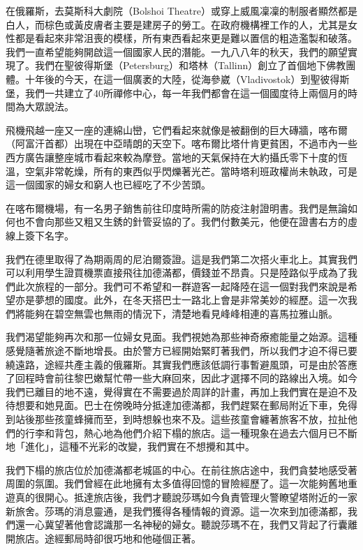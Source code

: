 在俄羅斯，去莫斯科大劇院（Bolshoi
Theatre）或穿上威風凜凜的制服者顯然都是白人，而棕色或黃皮膚者主要是建房子的勞工。在政府機構裡工作的人，尤其是女性都是看起來非常沮喪的模樣，所有東西看起來更是難以置信的粗造濫製和破落。我們一直希望能夠開啟這一個國家人民的潛能。一九八八年的秋天，我們的願望實現了。我們在聖彼得斯堡（Petersburg）和塔林（Tallinn）創立了首個地下佛教團體。十年後的今天，在這一個廣袤的大陸，從海參崴（Vladivostok）到聖彼得斯堡，我們一共建立了40所禪修中心，每一年我們都會在這一個國度待上兩個月的時間為大眾說法。

飛機飛越一座又一座的連綿山巒，它們看起來就像是被翻倒的巨大磚牆，喀布爾（阿富汗首都）出現在中亞晴朗的天空下。喀布爾比塔什肯更貧困，不過市內一些西方廣告讓整座城市看起來較為摩登。當地的天氣保持在大約攝氏零下十度的恆溫，空氣非常乾燥，所有的東西似乎閃爍著光芒。當時塔利班政權尚未執政，可是這一個國家的婦女和窮人也已經吃了不少苦頭。

在喀布爾機場，有一名男子銷售前往印度時所需的防疫注射證明書。我們是無論如何也不會向那些又粗又生銹的針管妥協的了。我們付數美元，他便在證書右方的虛線上簽下名字。

我們在德里取得了為期兩周的尼泊爾簽證。這是我們第二次搭火車北上。其實我們可以利用學生證買機票直接飛往加德滿都，價錢並不昂貴。只是陸路似乎成為了我們此次旅程的一部分。我們可不希望和一群遊客一起降陸在這一個對我們來說是希望亦是夢想的國度。此外，在冬天搭巴士一路北上會是非常美妙的經歷。這一次我們將能夠在碧空無雲也無雨的情況下，清楚地看見峰峰相連的喜馬拉雅山脈。

我們渴望能夠再次和那一位婦女見面。我們視她為那些神奇療癒能量之始源。這種感覺隨著旅途不斷地增長。由於警方已經開始緊盯著我們，所以我們才迫不得已要繞遠路，途經共產主義的俄羅斯。其實我們應該低調行事暫避風頭，可是由於答應了回程時會前往黎巴嫩幫忙帶一些大麻回來，因此才選擇不同的路線出入境。如今我們已離目的地不遠，覺得實在不需要過於周詳的計畫，再加上我們實在是迫不及待想要和她見面。巴士在傍晚時分抵達加德滿都，我們趕緊在郵局附近下車，免得到站後那些孩童蜂擁而至，到時想躲也來不及。這些孩童會纏著旅客不放，拉扯他們的行李和背包，熱心地為他們介紹下榻的旅店。這一種現象在過去六個月已不斷地「進化」，這種不光彩的改變，我們實在不想攪和其中。

我們下榻的旅店位於加德滿都老城區的中心。在前往旅店途中，我們貪婪地感受著周圍的氛圍。我們曾經在此地擁有太多值得回憶的冒險經歷了。這一次能夠舊地重遊真的很開心。抵達旅店後，我們才聽說莎瑪如今負責管理火警瞭望塔附近的一家新旅舍。莎瑪的消息靈通，是我們獲得各種情報的資源。這一次來到加德滿都，我們還一心冀望著他會認識那一名神秘的婦女。聽說莎瑪不在，我們又背起了行囊離開旅店。途經郵局時卻很巧地和他碰個正著。

